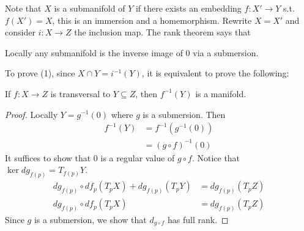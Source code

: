 \documentclass[12pt,class=article,crop=false]{standalone}
\begin{document}
Note that $ X$ is a submanifold of  $ Y$ if there exists an embedding $ f: X' \to Y$  s.t.\ $ f(X') = X$, this is an immersion and a homemorphism. Rewrite $ X=X'$ and consider $ i: X \to Z$ the inclusion map. The rank theorem says that 

Locally any submanifold is the inverse image of 0 via a submersion. 

To prove (1), since $ X \cap Y = i ^{-1}(Y)$, it is equivalent to prove the following:
\begin{thm}
If $ f: X \to Z$ is transversal to $ Y \subseteq Z$, then  $ f^{-1}(Y)$ is a manifold.
\end{thm}
\begin{proof}
Locally $ Y = g ^{-1}(0)$ where $ g$ is a submersion. Then
\begin{align*}
	f^{-1}(Y) &= f^{-1}(g^{-1}(0)) \\
	&= (g \circ f)^{-1}(0)
\end{align*}
It suffices to show that 0 is a regular value of $ g \circ f$. Notice that $ \ker dg_{f(p)} = T_{f(p)} Y$.
\begin{align*}
	dg _{f(p)} \circ df_{p}(T_p X) + d g_{f(p)} (T_pY)  &= d g_{f(p)} (T_p Z) \\
	dg _{f(p)} \circ df_{p}(T_p X)   &= d g_{f(p)} (T_p Z) 
\end{align*}
Since $ g$ is a submersion, we show that  $ d_{g \circ f}$ has full rank.
\end{proof}
\end{document}
